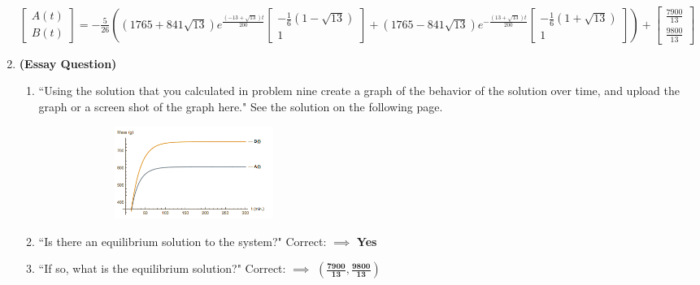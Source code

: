 \documentclass[11pt]{article}
\begin{document}
\begin{enumerate}
		\(\begin{bmatrix}
									A(t) \\ B(t)
								\end{bmatrix}=-\frac{5}{26}\left(\left(1765+841\sqrt{13}\right) e^{\tfrac{(-13+\sqrt{13})t}{200}} \begin{bmatrix} -\frac{1}{6}(1-\sqrt{13}) \\ 1 \end{bmatrix}+\left(1765-841\sqrt{13}\right)e^{-\tfrac{(13+\sqrt{13})t}{200}} \begin{bmatrix} -\frac{1}{6}(1+\sqrt{13}) \\ 1 \end{bmatrix}\right)+\begin{bmatrix}\frac{7900}{13} \\[.5em] \frac{9800}{13}\end{bmatrix}\)
		
		\item \textbf{(Essay Question)} 
				\begin{enumerate}
					\item ``Using the solution that you calculated in problem nine create a graph of the behavior of the solution over time, and upload the graph or a screen shot of the graph here." See the solution on the following page.
				\begin{figure}[h!]
					\centering
						\graphicspath{{/Users/tylertrogden/Desktop/}}
						\includegraphics[height=3cm,width=8cm]{W11_WQ_Q10} 
				\end{figure}

					
					\item ``Is there an equilibrium solution to the system?" Correct: $\implies$ \textbf{Yes}
					
					\item ``If so, what is the equilibrium solution?" Correct: $\implies$ \textbf{$\mathbf{\left(\frac{7900}{13},\frac{9800}{13}\right)}$}
				\end{enumerate}
	\end{enumerate}
\end{document}
